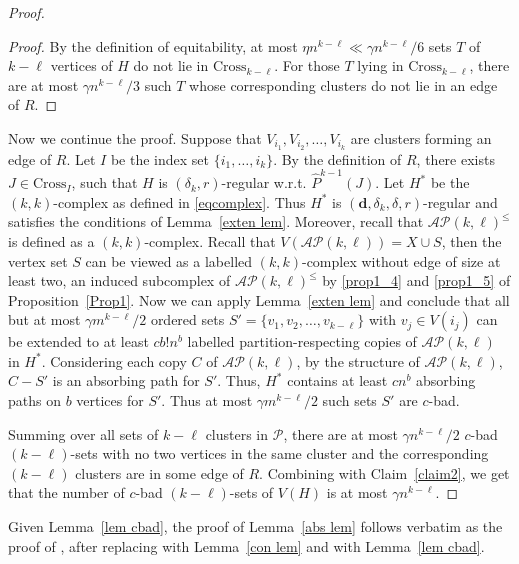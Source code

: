 \documentclass[11pt, reqno]{amsart}    	%
\theoremstyle{definition}
\numberwithin{equation}{section}
\begin{document}
\begin{appendix}
\begin{proof}
\begin{proof}
				By the definition of equitability, at most $\eta n^{k-\ell}\ll \gamma n^{k-\ell}/6$ sets $T$ of $k-\ell$ vertices of $H$ do not lie in $\text{Cross}_{k-\ell}$. For those $T$ lying in $\text{Cross}_{k-\ell}$,  there are at most $\gamma {n}^{k-\ell}/3$ such $T$ whose corresponding clusters do not lie in an edge of $ R $.
			\end{proof}
			
			Now we continue the proof.
			Suppose that $V_{i_{1}},V_{i_{2}},\dots,V_{i_{k}}$ are clusters forming an edge of $R$. Let $I$ be the index set $\{i_{1},\dots,i_{k}\}$. By the definition of $ R $, there exists $J\in \text{Cross}_{I}$, such that $H$ is $(\delta_{k},r)$-regular w.r.t. $\hat{P}^{k-1}(J)$. Let $H^{*}$ be the $(k,k)$-complex %
			as defined in \eqref{eqcomplex}. Thus $H^{*}$ is  $(\mathbf{d},\delta_{k},\delta,r)$-regular and satisfies the conditions of Lemma~\ref{exten lem}. Moreover, recall that $\mathcal{AP}(k,\ell)^{\le}$ is defined as a $(k,k)$-complex. Recall that $V(\mathcal{AP}(k,\ell))=X\cup S$, then the vertex set $S$ can be viewed as a labelled $(k,k)$-complex without edge of size at least two,  an induced subcomplex of  $\mathcal{AP}(k,\ell)^{\le}$ by \eqref{prop1_4} and \eqref{prop1_5} of Proposition~\ref{Prop1}. Now we can apply Lemma~\ref{exten lem} and conclude that all but at most  $\gamma m^{k-\ell}/2$ ordered sets $S'=\{v_{1},v_{2},\dots,v_{k-\ell} \}$ with  $v_{j}\in V(i_{j})$ can be  extended to at least $cb!n^{b}$ labelled partition-respecting copies of $\mathcal{AP}(k,\ell)$ in $H^{*}$.
			Considering each copy $C$ of $\mathcal{AP}(k,\ell)$, by the structure of  $\mathcal{AP}(k,\ell)$, $C-S'$ is an absorbing path for $S'$. Thus,  $H^{*}$ contains at least $cn^{b}$ absorbing paths on $b$ vertices for $S'$. Thus at most $\gamma m^{k-\ell}/2$ such sets $S'$ are $c$-bad. 
			
			Summing over all sets of $k-\ell$ clusters in $\mathcal P$, there are at most  $\gamma n^{k-\ell}/2$ $c$-bad $(k-\ell)$-sets with no two vertices in the same cluster and the corresponding $(k-\ell)$ clusters are in some edge of $R$.	Combining with Claim~\ref{claim2}, we get that the number of $c$-bad $(k-\ell)$-sets of  $V(H)$ is at most  $\gamma n^{k-\ell}$. 
		\end{proof}

Given Lemma~\ref{lem cbad}, the proof of Lemma~\ref{abs lem} follows verbatim as the proof of \cite[Lemma 6.3]{Daniela2010Hamilton}, after replacing \cite[Corollary 5.4]{Daniela2010Hamilton} with Lemma~\ref{con lem} and \cite[Lemma 6.2]{Daniela2010Hamilton} with  Lemma~\ref{lem cbad}.
	

\end{appendix}
\end{document}
